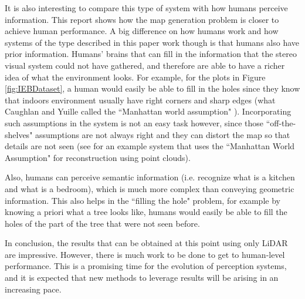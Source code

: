 \documentclass[11pt]{article}
\begin{document}
It is also interesting to compare this type of system with how humans perceive information. This report shows how the map generation problem is closer to achieve human performance. A big difference on how humans work and how systems of the type described in this paper work though is that humans also have prior information. Humans' brains that can fill in the information that the stereo visual system could not have gathered, and therefore are able to have a richer idea of what the environment looks. For example, for the plots in Figure \ref{fig:IEBDataset}, a human would easily be able to fill in the holes since they know that indoors environment usually have right corners and sharp edges (what Caughlan and Yuille called the ``Manhattan world assumption" \cite{coughlan1999manhattan}). Incorporating such assumptions in the system is not an easy task however, since those ``off-the-shelves" assumptions are not always right and they can distort the map so that details are not seen (see \cite{li2016boxfitting} for an example system that uses the ``Manhattan World Assumption" for reconstruction using point clouds).
 
Also, humans can perceive semantic information (i.e. recognize what is a kitchen and what is a bedroom), which is much more complex than conveying geometric information. This also helps in the ``filling the hole" problem, for example by knowing a priori what a tree looks like, humans would easily be able to fill the holes of the part of the tree that were not seen before.

In conclusion, the results that can be obtained at this point using only LiDAR are impressive. However, there is much work to be done to get to human-level performance. This is a promising time for the evolution of perception systems, and it is expected that new methods to leverage results will be arising in an increasing pace.


	\newpage
	
	
\end{document}
